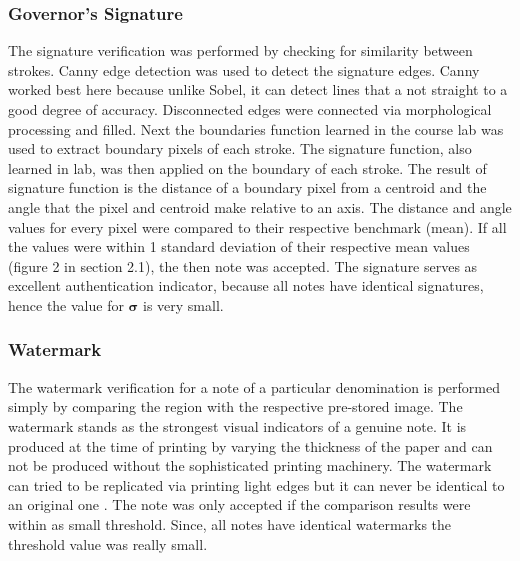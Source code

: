 \documentclass{article}
\begin{document}
\subsubsection{Governor’s Signature}
The signature verification was performed by checking for similarity between strokes. Canny edge detection was used to detect the signature edges. Canny worked best here because unlike Sobel, it can detect lines that a not straight to a good degree of accuracy. Disconnected edges were connected via morphological processing and filled. Next the boundaries function learned in the course lab was used to extract boundary pixels of each stroke. The signature function, also learned in lab, was then applied on the boundary of each stroke. The result of signature function is the distance of a boundary pixel from a centroid and the angle that the pixel and centroid make relative to an axis. The distance and angle values for every pixel were compared to their respective benchmark (mean). If all the values were within 1 standard deviation of their respective mean values (figure 2 in section 2.1), the then note was accepted. The signature serves as excellent authentication indicator, because all notes have identical signatures, hence the value for $\mathbf{\sigma}$ is very small.

\subsubsection{Watermark}
The watermark verification for a note of a particular denomination is performed simply by comparing the region with the respective pre-stored image. The watermark stands as the strongest visual indicators of a genuine note. It is produced at the time of printing by varying the thickness of the paper and can not be produced without the sophisticated printing machinery. The watermark can tried to be replicated via printing light edges but it can never be identical to an original one \cite{ScaleUp_MLSP:14}. The note was only accepted if the comparison results were within as small threshold. Since, all notes have identical watermarks the threshold value was really small.
\end{document}
